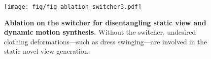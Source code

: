 \begin{figure}[t]
    \centering
    \texttt{[image: fig/fig\_ablation\_switcher3.pdf]}
    \caption{\textbf{Ablation on the switcher for disentangling static view and dynamic motion synthesis.} Without the switcher, undesired clothing deformations—such as dress swinging—are involved in the static novel view generation.}
    \label{fig:ablation_swicher}
    \vspace{-1.0em} 
\end{figure}
